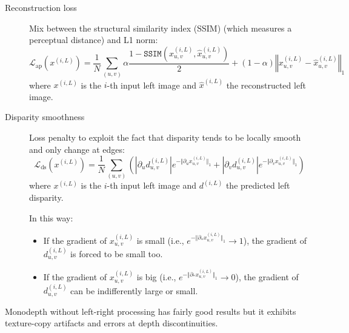 \begin{description}
\begin{description}
                \begin{description}
                    \item[Reconstruction loss] 
                        Mix between the structural similarity index (SSIM) (which measures a perceptual distance) and L1 norm:
                        \[ \mathcal{L}_{\text{ap}}(x^{(i, L)}) = \frac{1}{N} \sum_{(u, v)} \alpha \frac{1-\texttt{SSIM}(x_{u, v}^{(i, L)}, \hat{x}_{u, v}^{(i, L)})}{2} + (1-\alpha) \left\Vert x_{u, v}^{(i, L)} - \hat{x}_{u, v}^{(i, L)} \right\Vert_1 \]
                        where $x^{(i, L)}$ is the $i$-th input left image and $\hat{x}^{(i, L)}$ the reconstructed left image.

                    \item[Disparity smoothness] 
                        Loss penalty to exploit the fact that disparity tends to be locally smooth and only change at edges:
                        \[ \mathcal{L}_{\text{ds}}(x^{(i, L)}) = \frac{1}{N} \sum_{(u, v)} \left(\left\vert \partial_u d_{u, v}^{(i, L)} \right\vert e^{- \Vert \partial_u x_{u, v}^{(i, L)} \Vert_1} + \left\vert \partial_v d_{u, v}^{(i, L)} \right\vert e^{- \Vert \partial_v x_{u, v}^{(i, L)} \Vert_1} \right) \]
                        where $x^{(i, L)}$ is the $i$-th input left image and $d^{(i, L)}$ the predicted left disparity.

                        In this way:
                        \begin{itemize}
                            \item If the gradient of $x_{u, v}^{(i, L)}$ is small (i.e., $e^{- \Vert \partial_* x_{u, v}^{(i, L)} \Vert_1} \rightarrow 1$), the gradient of $d_{u, v}^{(i, L)}$ is forced to be small too.
                            \item If the gradient of $x_{u, v}^{(i, L)}$ is big (i.e., $e^{- \Vert \partial_* x_{u, v}^{(i, L)} \Vert_1} \rightarrow 0$), the gradient of $d_{u, v}^{(i, L)}$ can be indifferently large or small.
                        \end{itemize}
                \end{description}
        \end{description}

        \begin{remark}
            Monodepth without left-right processing has fairly good results but it exhibits texture-copy artifacts and errors at depth discontinuities.


\end{remark}
\end{description}
